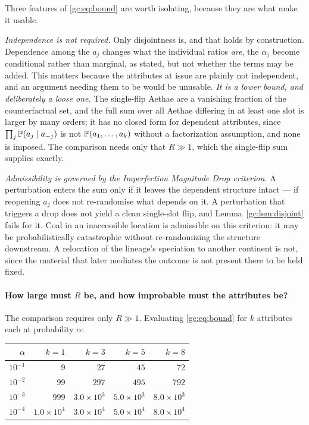 \begin{remark}
\label{gc:rem:boundrequires}
Three features of \eqref{gc:eq:bound} are worth isolating, because they
are what make it usable.

\emph{Independence is not required.} Only disjointness is, and that
holds by construction. Dependence among the $a_j$ changes what the
individual ratios \emph{are}, the $\alpha_j$ become conditional
rather than marginal, as stated, but not whether the terms may be
added. This matters because the attributes at issue are plainly not
independent, and an argument needing them to be would be unusable. \emph{It is a lower bound, and deliberately a loose one.} The
single-flip Aethae are a vanishing fraction of the counterfactual set,
and the full sum over all Aethae differing in at least one slot is
larger by many orders; it has no closed form for dependent attributes,
since $\prod_j\mathbb{P}(a_j\mid a_{-j})$ is not $\mathbb{P}(a_1,\dots,a_k)$ without
a factorization assumption, and none is imposed. The comparison needs
only that $R\gg1$, which the single-flip sum supplies exactly.

\emph{Admissibility is governed by the Imperfection Magnitude Drop
criterion.} A perturbation enters the sum only if it leaves the
dependent structure intact --- if reopening $a_j$ does not re-randomise
what depends on it. A perturbation that triggers a drop does not yield a
clean single-slot flip, and Lemma~\ref{gc:lem:disjoint} fails for it.
Coal in an inaccessible location is admissible on this criterion: it may
be probabilistically catastrophic without re-randomizing the structure
downstream. A relocation of the lineage's speciation to another
continent is not, since the material that later mediates the outcome is
not present there to be held fixed.
\end{remark}

\paragraph{How large must $R$ be, and how improbable must the
attributes be?} The comparison requires only $R\gg1$. Evaluating
\eqref{gc:eq:bound} for $k$ attributes each at probability $\alpha$:

\begin{center}\small
\begin{tabular}{@{}rrrrr@{}}
\toprule
$\alpha$ & $k=1$ & $k=3$ & $k=5$ & $k=8$\\
\midrule
$10^{-1}$ & $9$ & $27$ & $45$ & $72$\\
$10^{-2}$ & $99$ & $297$ & $495$ & $792$\\
$10^{-3}$ & $999$ & $3.0\times10^{3}$ & $5.0\times10^{3}$ & $8.0\times10^{3}$\\
$10^{-4}$ & $1.0\times10^{4}$ & $3.0\times10^{4}$ & $5.0\times10^{4}$ & $8.0\times10^{4}$\\
\bottomrule
\end{tabular}
\end{center}

